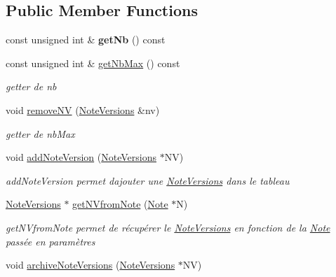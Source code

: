 \subsection*{Public Member Functions}
\begin{DoxyCompactItemize}
\item 
\mbox{\label{classNoteManager_ab5be40a9b52098812241d324dee8c5fa}} 
const unsigned int \& {\bfseries get\+Nb} () const
\item 
\mbox{\label{classNoteManager_a0f2fe0b27005ac9dcf5d822ef1b83123}} 
const unsigned int \& \hyperlink{classNoteManager_a0f2fe0b27005ac9dcf5d822ef1b83123}{get\+Nb\+Max} () const
\begin{DoxyCompactList}\small\item\em getter de nb \end{DoxyCompactList}\item 
\mbox{\label{classNoteManager_a0eb6318998b3237f03d5dcf00d4e1d8f}} 
void \hyperlink{classNoteManager_a0eb6318998b3237f03d5dcf00d4e1d8f}{remove\+NV} (\hyperlink{classNoteVersions}{Note\+Versions} \&nv)
\begin{DoxyCompactList}\small\item\em getter de nb\+Max \end{DoxyCompactList}\item 
void \hyperlink{classNoteManager_a69d289844606be132d3c76f5f49128b9}{add\+Note\+Version} (\hyperlink{classNoteVersions}{Note\+Versions} $\ast$NV)
\begin{DoxyCompactList}\small\item\em add\+Note\+Version permet d\textquotesingle{}ajouter une \hyperlink{classNoteVersions}{Note\+Versions} dans le tableau \end{DoxyCompactList}\item 
\hyperlink{classNoteVersions}{Note\+Versions} $\ast$ \hyperlink{classNoteManager_a9c4e9b0b563de66246f813290a4744d9}{get\+N\+Vfrom\+Note} (\hyperlink{classNote}{Note} $\ast$N)
\begin{DoxyCompactList}\small\item\em get\+N\+Vfrom\+Note permet de récupérer le \hyperlink{classNoteVersions}{Note\+Versions} en fonction de la \hyperlink{classNote}{Note} passée en paramètres \end{DoxyCompactList}\item 
void \hyperlink{classNoteManager_a8afd2b5e03732ed59778e96b201cc847}{archive\+Note\+Versions} (\hyperlink{classNoteVersions}{Note\+Versions} $\ast$NV)

\end{DoxyCompactItemize}
